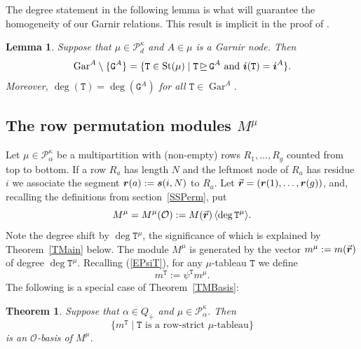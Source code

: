 \documentclass[twoside,11pt,reqno]{amsart}
\numberwithin{equation}{section}
\newtheorem{Lemma}[equation]{Lemma}
\newtheorem{Theorem}[equation]{Theorem}
\theoremstyle{definition}  %
\let\<\langle
\let\>\rangle
\DeclareMathOperator\gedom{\trianglerighteq}
\def\bi{\text{\boldmath$i$}}
\def\bs{\text{\boldmath$s$}}
\def\br{\text{\boldmath$r$}}
\newcommand{\St}{\operatorname{St}}
\newcommand{\cont}{\operatorname{cont}}
\newcommand{\0}{{\bar 0}}
\newcommand{\1}{{\bar 1}}
\newcommand{\al}{\alpha}
\def\Si{\mathfrak{S}}
\newcommand\Par[1][]{{\mathscr P}^{\kappa#1}}
\def\T{{\mathtt T}}
\def\G{{\mathtt G}}
\def\Gar{{\operatorname{Gar}}}
\renewcommand\O{\mathcal O}
\begin{document}
The degree statement in the following lemma is what will guarantee the homogeneity of our Garnir relations. This result is implicit in the proof of \cite[Proposition~3.16]{BKW}. 

\begin{Lemma}\label{L10910}
  Suppose that $\mu\in\Par_d$ and $A\in\mu$ is a Garnir node. Then
$$
\Gar^A\setminus\{\G^A\}=\{\T\in\St(\mu)\mid \T\gedom\G^A\ \text{and}\ \bi(\T)=\bi^A\}.
$$
Moreover, $\deg(\T)=\deg(\G^A)$ for all $\T\in\Gar^A$. 
\end{Lemma}





\subsection{\boldmath The row permutation modules $M^\mu$}
Let $\mu\in \Par_\al$ be a multipartition with (non-empty) rows $R_1,\dots,R_g$ counted from
top to bottom. If a row $R_a$ has length $N$ and the leftmost node of $R_a$ has residue $i$
we associate the segment $\br(a):=\bs(i,N)$ to $R_a$. Let $\vec{\br}=(\br(1),\dots,\br(g))$,
and, recalling the definitions from section~\ref{SSPerm}, put 
$$
M^\mu=M^\mu(\O):=M(\vec{\br})\,\<\deg \T^\mu\>.
$$ 
Note the degree shift by $\deg \T^\mu$, the significance of which is explained by Theorem~\ref{TMain} below. 
The module $M^\mu$ is generated by the vector
$
m^\mu:=m(\vec{\br}) 
$
of degree $\deg \T^\mu$. Recalling (\ref{EPsiT}), for any $\mu$-tableau $\T$ we define 
$$
m^\T:=\psi^\T m^\mu.
$$
The following is a special case of Theorem~\ref{TMBasis}:

\begin{Theorem} \label{TMMUBasis}%
Suppose that $\al\in Q_+$ and $\mu\in\Par_\al$. Then 
$$
\{m^\T\mid \text{$\T$ is a row-strict $\mu$-tableau}\}
$$
is an $\O$-basis of $M^\mu$.  
\end{Theorem}
\end{document}
